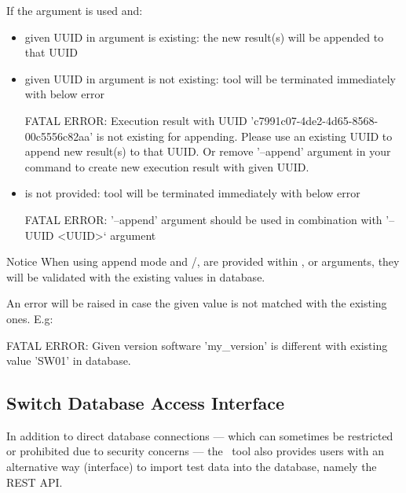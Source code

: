     If the argument  is used and:
    \begin{itemize}
      \item given UUID in  argument is existing:
            the new result(s) will be appended to that UUID
      \item given UUID in  argument is not existing:
            tool will be terminated immediately with below error
\begin{robotlog}
FATAL ERROR: Execution result with UUID 'c7991c07-4de2-4d65-8568-00c5556c82aa' is not existing for appending.
             Please use an existing UUID to append new result(s) to that UUID.
             Or remove '--append' argument in your command to create new execution result with given UUID.
\end{robotlog}
      \item {} is not provided:
            tool will be terminated immediately with below error
\begin{robotlog}
FATAL ERROR: '--append' argument should be used in combination with '--UUID <UUID>` argument
\end{robotlog}
    \end{itemize}

    \begin{boxhint} {Notice}
      When using append mode and /,
       are provided within ,
       or  arguments, they will
      be validated with the existing values in database.

      An error will be raised in case the given value is not matched with the
      existing ones. E.g:
\begin{robotlog}
FATAL ERROR: Given version software 'my_version' is different with existing value 'SW01' in database.
\end{robotlog}
    \end{boxhint}

  \subsection{Switch Database Access Interface}\label{switch-database-access-interface}
  In addition to direct database connections — which can sometimes be restricted 
  or prohibited due to security concerns — the \pkg\ tool also provides users 
  with an alternative way (interface) to import test data into the database, 
  namely the REST API.

